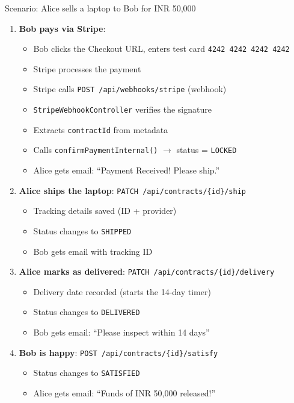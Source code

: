 \documentclass[11pt, a4paper]{article}
\begin{document}
\begin{examplebox}{Scenario: Alice sells a laptop to Bob for INR 50,000}
\begin{enumerate}[leftmargin=*]
    \item \textbf{Bob pays via Stripe}:
        \begin{itemize}
            \item Bob clicks the Checkout URL, enters test card \texttt{4242 4242 4242 4242}
            \item Stripe processes the payment
            \item Stripe calls \texttt{POST /api/webhooks/stripe} (webhook)
            \item \texttt{StripeWebhookController} verifies the signature
            \item Extracts \texttt{contractId} from metadata
            \item Calls \texttt{confirmPaymentInternal()} $\rightarrow$ status = \texttt{LOCKED}
            \item Alice gets email: ``Payment Received! Please ship.''
        \end{itemize}
    
    \item \textbf{Alice ships the laptop}: \texttt{PATCH /api/contracts/\{id\}/ship}
        \begin{itemize}
            \item Tracking details saved (ID + provider)
            \item Status changes to \texttt{SHIPPED}
            \item Bob gets email with tracking ID
        \end{itemize}
    
    \item \textbf{Alice marks as delivered}: \texttt{PATCH /api/contracts/\{id\}/delivery}
        \begin{itemize}
            \item Delivery date recorded (starts the 14-day timer)
            \item Status changes to \texttt{DELIVERED}
            \item Bob gets email: ``Please inspect within 14 days''
        \end{itemize}
    
    \item \textbf{Bob is happy}: \texttt{POST /api/contracts/\{id\}/satisfy}
        \begin{itemize}
            \item Status changes to \texttt{SATISFIED}
            \item Alice gets email: ``Funds of INR 50,000 released!''
        \end{itemize}
    

\end{enumerate}
\end{examplebox}
\end{document}
